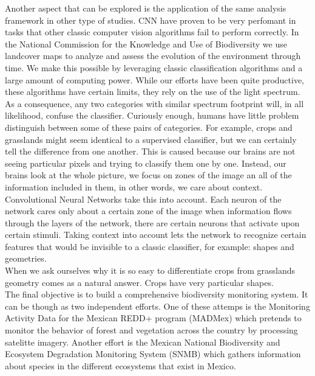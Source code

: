 Another aspect that can be explored is the application of the same analysis framework in other type of studies. CNN have proven to be very perfomant in tasks that other classic computer vision algorithms fail to perform correctly. In the National Commission for the Knowledge and Use of Biodiversity we use landcover maps to analyze and assess the evolution of the environment through time. We make this possible by leveraging classic classification algorithms and a large amount of computing power. While our efforts have been quite productive, these algorithms have certain limits, they rely on the use of the light spectrum. As a consequence, any two categories with similar spectrum footprint will, in all likelihood, confuse the classifier. Curiously enough, humans have little problem distinguish between some of these pairs of categories. For example, crops and grasslands might seem identical to a supervised classifier, but we can certainly tell the difference from one another. This is caused because our brains are not seeing particular pixels and trying to classify them one by one. Instead, our brains look at the whole picture, we focus on zones of the image an all of the information included in them, in other words, we care about context. Convolutional Neural Networks take this into account. Each neuron of the network cares only about a certain zone of the image when information flows through the layers of the network, there are certain neurons that activate upon certain stimuli. Taking context into account lets the network to recognize certain features that would be invisible to a classic classifier, for example: shapes and geometries.\\

When we ask ourselves why it is so easy to differentiate crops from grasslands geometry comes as a natural answer. Crops have very particular shapes.\\

The final objective is to build a comprehensive biodiversity monitoring system. It can be though as two independent efforts. One of these attemps is the Monitoring Activity Data for the Mexican REDD+ program (MADMex) \cite{rs6053923} which pretends to monitor the behavior of forest and vegetation across the country by processing satelitte imagery. Another effort is the Mexican National Biodiversity and Ecosystem Degradation Monitoring System (SNMB) \cite{GARCIAALANIZ201762} which gathers information about species in the different ecosystems that exist in Mexico.\\

